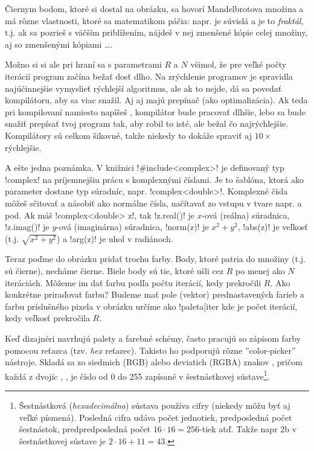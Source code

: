 Čiernym bodom, ktoré si dostal na obrázku, sa hovorí Mandelbrotova množina a má rôzne
vlastnosti, ktoré sa matematikom páčia: napr. je súvislá a je to {\em fraktál}, t.j.
ak sa pozrieš s väčším priblížením, nájdeš v nej zmenšené kópie celej množiny, aj 
so zmenšenými kópiami \ldots.


Možno si si ale pri hraní sa s parametrami $R$ a $N$ všimol, že pre veľké počty
iterácií program začína bežať dosť dlho. Na zrýchlenie programov je spravidla najúčinnejšie
vymyslieť rýchlejší algoritmus, ale ak to nejde, dá sa povedať kompilátoru, aby sa viac snažil.
Aj  aj   majú 
prepínač  (ako optimalizácia). 
Ak teda pri kompilovaní namiesto 
napíšeš , kompilátor bude pracovať dlhšie, lebo sa bude
snažiť prepísať tvoj program tak, aby robil to isté, ale bežal čo najrýchlejšie. 
Kompilátory sú celkom šikovné, takže niekedy
to dokáže spraviť aj $10\times$ rýchlejšie.


A ešte jedna poznámka. V knižnici \prg!#include<complex>! je definovaný typ
\prg!complex! na príjemnejšiu prácu s komplexnými číslami.
Je to šablóna, ktorá ako parameter dostane typ súradníc, napr. \prg!complex<double>!.
Komplexné čísla môžeš  sčitovať
a násobiť ako normálne čísla, načítavať zo vstupu v tvare napr. 
a pod. Ak máš \prg!complex<double> z!, tak \prg!z.real()! je $x$-ová (reálna) súradnica, 
\prg!z.imag()! je $y$-ová (imaginárna) súradnica, \prg!norm(z)! je $x^2+y^2$,
\prg!abs(z)! je veľkosť (t.j. $\sqrt{x^2+y^2}$) a \prg!arg(z)! je uhol v radiánoch.


Teraz poďme do obrázku pridať trochu farby. Body, ktoré patria do množiny (t.j. sú čierne),
necháme čierne. Biele body sú tie, ktoré ušli cez $R$ po menej ako $N$ iteráciách. Môžeme 
im dať farbu podľa počtu iterácií, kedy prekročili $R$. 
Ako konkrétne priraďovať farbu? Budeme mať pole (vektor) 
prednastavených farieb a farbu príslušného pixela v obrázku určíme ako 
\prg!paleta[iter %
kde  je počet iterácií, kedy veľkosť prekročila $R$. 


Keď dizajnéri navrhujú palety a farebné schémy, často pracujú so zápisom farby pomocou
reťazca (tzv. {\em hex} reťazec). Takisto ho podporujú rôzne ''color-picker'' nástroje.
Skladá sa zo siedmich (RGB) alebo deviatich (RGBA) znakov
\def\tmp#1{\vb{\textcolor{magenta}{#1}}}
\tmp{\#RRGGBB}, pričom každá z dvojíc \tmp{RR}, \tmp{GG}, \tmp{BB}
je číslo od 0 do 255 zapísané v šestnástkovej sústave\footnote{%
  Šestnástková ({\em hexadecimálna}) sústava používa cifry
   (niekedy môžu byť aj veľké písmená).
  Posledná cifra udáva počet jednotiek, predposledná počet šestnástok, predpredposledná
  počet $16\cdot16=256$-tiek atď. Takže napr {\rmfamily 2b} v šestnástkovej sústave je
  $2\cdot16+11=43$.
}.

